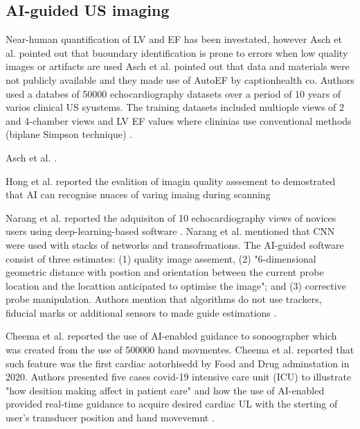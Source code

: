 \subsection{AI-guided US imaging}

Near-human quantification of LV and EF has been investated, however Asch et al. pointed out that buoundary identification is prone to errors when low quality images or artifacts are used
Asch et al. pointed out that data and materials were not publicly available and they made use of AutoEF by captionhealth co.
Authors used a databes of 50000 echocardiography datasets over a period of 10 years of varios clinical US syustems. 
The training datasets included multiople views of 2 and 4-chamber views and LV EF values where clininias use conventional methods (biplane Simpson technique) \cite{asch2019CIRIMAGING}.

Asch et al. \cite{asch2021CircImaging}.

Hong et al. reported the evalition of imagin quality asssement to demostrated that AI can recognise nuaces of varing imaing during scanning \cite{hong2021JACC}


Narang et al. reported the adquisiton of 10 echocardiography views of novices users using deep-learning-based software \cite{Narang2021JAMACARDIOLOGY}.
Narang et al. mentioned that CNN were used with stacks of networks and transofrmations. 
The AI-guided software consist of three estimates: (1) quality image assement, (2) "6-dimensional geometric distance with postion and orientation between the current probe location and the locattion anticipated to optimise the image"; and (3) corrective probe manipulation. \cite{Narang2021JAMACARDIOLOGY}
Authors mention that algorithms do not use trackers, fiducial marks or additional sensors to made guide estimations \cite{Narang2021JAMACARDIOLOGY}.


Cheema et al. reported the use of AI-enabled guidance to sonoographer which was created from the use of 500000 hand movmentes.
Cheema et al.  reported that such feature was the first cardiac aotorhisedd by Food and Drug adminstation in 2020. 
Authors presented five cases covid-19 intensive care unit (ICU) to illustrate "how desition making affect in patient care" and how the use of AI-enabled provided real-time guidance to acquire desired cardiac UL with the sterting of user's transducer position and hand movevemnt \cite{CHEEMA2021JACCCaseReports}.



